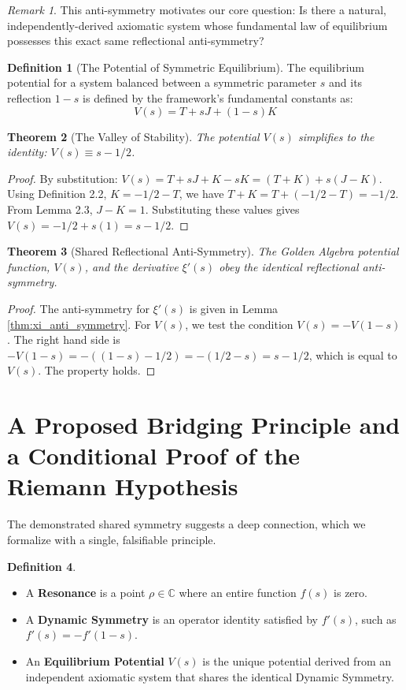 \documentclass{article}
\theoremstyle{plain}
\newtheorem{theorem}{Theorem}[section]
\theoremstyle{definition}
\newtheorem{definition}[theorem]{Definition}
\theoremstyle{remark}
\newtheorem*{remark}{Remark}
\begin{document}
\begin{remark}
This anti-symmetry motivates our core question: Is there a natural, independently-derived axiomatic system whose fundamental law of equilibrium possesses this exact same reflectional anti-symmetry? 
\end{remark}

\begin{definition}[The Potential of Symmetric Equilibrium]
The equilibrium potential for a system balanced between a symmetric parameter $s$ and its reflection $1-s$ is defined by the framework's fundamental constants as:
$$V(s) = T + sJ + (1-s)K$$
\end{definition}

\begin{theorem}[The Valley of Stability]
The potential $V(s)$ simplifies to the identity: $V(s) \equiv s - 1/2$.
\end{theorem}
\begin{proof}
By substitution: $V(s) = T + sJ + K - sK = (T+K) + s(J-K)$. Using Definition 2.2, $K=-1/2-T$, we have $T+K = T+(-1/2-T) = -1/2$. From Lemma 2.3, $J-K=1$. Substituting these values gives $V(s) = -1/2 + s(1) = s - 1/2$.
\end{proof}

\begin{theorem}[Shared Reflectional Anti-Symmetry]
The Golden Algebra potential function, $V(s)$, and the derivative $\xi'(s)$ obey the identical reflectional anti-symmetry.
\end{theorem}
\begin{proof}
The anti-symmetry for $\xi'(s)$ is given in Lemma \ref{thm:xi_anti_symmetry}. For $V(s)$, we test the condition $V(s) = -V(1-s)$. The right hand side is $-V(1-s) = -((1-s) - 1/2) = -(1/2 - s) = s - 1/2$, which is equal to $V(s)$. The property holds.
\end{proof}

\section{A Proposed Bridging Principle and a Conditional Proof of the Riemann Hypothesis}
The demonstrated shared symmetry suggests a deep connection, which we formalize with a single, falsifiable principle.

\begin{definition}
\begin{itemize}
    \item A \textbf{Resonance} is a point $\rho \in \mathbb{C}$ where an entire function $f(s)$ is zero.
    \item A \textbf{Dynamic Symmetry} is an operator identity satisfied by $f'(s)$, such as $f'(s) = -f'(1-s)$.
    \item An \textbf{Equilibrium Potential} $V(s)$ is the unique potential derived from an independent axiomatic system that shares the identical Dynamic Symmetry.
\end{itemize}
\end{definition}
\end{document}
